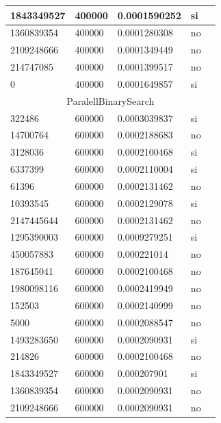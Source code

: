 \documentclass[12pt, fleqn]{article}                             %
\theoremstyle{break}                                            %
\begin{document}
\begin{longtable}{|m{5em}|m{5em}|m{10em}|m{5em}|@{}m{0pt}@{}}
            1843349527& 400000  & 0.0001590252 & si &\\[1em]    \hline
            1360839354& 400000  & 0.0001280308 & no &\\[1em]    \hline
            2109248666& 400000  & 0.0001349449 & no &\\[1em]    \hline
            214747085& 400000  & 0.0001399517 & no &\\[1em]    \hline
            0& 400000  & 0.0001649857 & si &\\[1em]    \hline
            \multicolumn{5}{|c|}{ParalellBinarySearch}   \\          \hline
            322486& 600000  & 0.0003039837 & si &\\[1em]    \hline
            14700764& 600000  & 0.0002188683 & no &\\[1em]    \hline
            3128036& 600000  & 0.0002100468 & si &\\[1em]    \hline
            6337399& 600000  & 0.0002110004 & si &\\[1em]    \hline
            61396& 600000  & 0.0002131462 & no &\\[1em]    \hline
            10393545& 600000  & 0.0002129078 & si &\\[1em]    \hline
            2147445644& 600000  & 0.0002131462 & no &\\[1em]    \hline
            1295390003& 600000  & 0.0009279251 & si &\\[1em]    \hline
            450057883& 600000  & 0.000221014 & no &\\[1em]    \hline
            187645041& 600000  & 0.0002100468 & no &\\[1em]    \hline
            1980098116& 600000  & 0.0002419949 & no &\\[1em]    \hline
            152503& 600000  & 0.0002140999 & no &\\[1em]    \hline
            5000& 600000  & 0.0002088547 & no &\\[1em]    \hline
            1493283650& 600000  & 0.0002090931 & si &\\[1em]    \hline
            214826& 600000  & 0.0002100468 & no &\\[1em]    \hline
            1843349527& 600000  & 0.000207901 & si &\\[1em]    \hline
            1360839354& 600000  & 0.0002090931 & no &\\[1em]    \hline
            2109248666& 600000  & 0.0002090931 & no &\\[1em]    \hline

\end{longtable}
\end{document}
